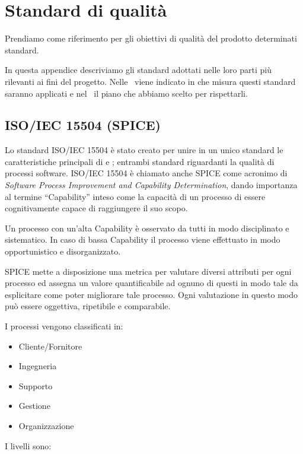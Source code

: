 \newpage

\section{Standard di qualità}	\label{standard di qualità}
Prendiamo come riferimento per gli obiettivi di qualità del prodotto determinati standard.


In questa appendice descriviamo gli standard adottati nelle loro parti più rilevanti ai fini del progetto. Nelle \NdPd\ viene indicato in che misura questi standard saranno applicati e nel \PdQd\ il piano che abbiamo scelto per rispettarli.

	\subsection{ISO/IEC 15504 (SPICE)}\label{iso15504}
	Lo standard ISO/IEC 15504 è stato creato per unire in un unico standard le caratteristiche principali di  e ; entrambi standard riguardanti la qualità di processi software.
	ISO/IEC 15504 è chiamato anche SPICE come acronimo di \textit{Software Process Improvement and Capability Determination}, dando importanza al termine ``Capability'' inteso come la capacità di un processo di essere cognitivamente capace di raggiungere il suo scopo.

	Un processo con un'alta Capability è osservato da tutti in modo disciplinato e sistematico.
	In caso di bassa Capability il processo viene effettuato in modo opportunistico e disorganizzato.

	SPICE mette a disposizione una metrica per valutare diversi attributi per ogni processo ed assegna un valore quantificabile
	ad ognuno di questi in modo tale da esplicitare come poter migliorare tale processo. Ogni valutazione in questo modo può essere oggettiva, ripetibile e comparabile.

	I processi vengono classificati in:

	\begin{itemize}
		\item Cliente/Fornitore
		\item Ingegneria
		\item Supporto
		\item Gestione
		\item Organizzazione
	\end{itemize}

	I livelli sono:

